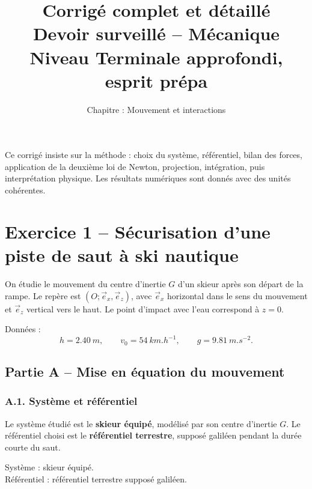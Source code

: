 \documentclass[11pt,a4paper]{article}
\title{
  \vspace{-1cm}
  \Huge\textbf{Corrigé complet et détaillé}\\
  \Large Devoir surveillé -- Mécanique\\
  \large Niveau Terminale approfondi, esprit prépa
}
\author{Chapitre : Mouvement et interactions}
\date{}
\begin{document}
\maketitle

\begin{center}
\begin{tcolorbox}[colframe=bleuprepa,colback=grisclair,width=0.95\textwidth]
Ce corrigé insiste sur la méthode : choix du système, référentiel, bilan des forces,
application de la deuxième loi de Newton, projection, intégration, puis interprétation physique.
Les résultats numériques sont donnés avec des unités cohérentes.
\end{tcolorbox}
\end{center}

\tableofcontents
\newpage

\section{Exercice 1 -- Sécurisation d'une piste de saut à ski nautique}

On étudie le mouvement du centre d'inertie $G$ d'un skieur après son départ de la rampe.
Le repère est $(O;\vec e_x,\vec e_z)$, avec $\vec e_x$ horizontal dans le sens du mouvement et
$\vec e_z$ vertical vers le haut. Le point d'impact avec l'eau correspond à $z=0$.

Données :
\[
h=\SI{2.40}{m}, \qquad v_0=\SI{54}{km.h^{-1}}, \qquad g=\SI{9.81}{m.s^{-2}}.
\]

\subsection{Partie A -- Mise en équation du mouvement}

\subsubsection*{A.1. Système et référentiel}

Le système étudié est le \textbf{skieur équipé}, modélisé par son centre d'inertie $G$.
Le référentiel choisi est le \textbf{référentiel terrestre}, supposé galiléen pendant la durée courte du saut.

\begin{resultatbox}
Système : skieur équipé. \\
Référentiel : référentiel terrestre supposé galiléen.
\end{resultatbox}
\end{document}
